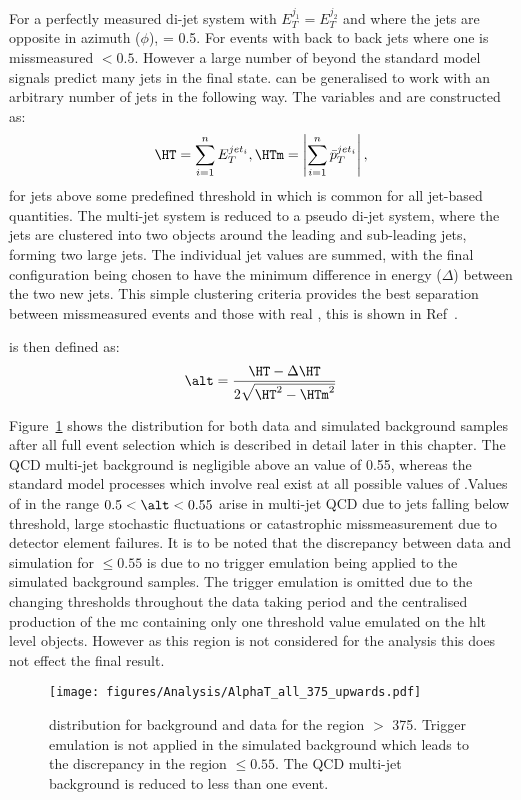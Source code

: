 For a perfectly measured di-jet system with $E_{T}^{j_{1}} = E_{T}^{j_{2}}$ and 
where the jets are opposite in azimuth ($\phi$), \alt = 0.5. For events with back to back jets where one is missmeasured \alt $ < 0.5$.
However a large number of beyond the standard model signals predict many jets in the final state. \alt can be generalised to work with an arbitrary number of jets in the following way. The variables \HT and \HTm are constructed as:
\begin{equation}
  \HT = \sum_{i = 1}^{n}E_{T}^{jet_{i}}, \\
  \HTm = \left|\sum_{i = 1}^{n}\bar{p}_{T}^{jet_{i}}\right|,
\end{equation}
for jets above some predefined threshold in \ET which is common for all jet-based quantities. The multi-jet system is reduced to a pseudo di-jet system, where the jets are clustered into two objects around the leading and sub-leading jets, forming two large jets. The individual jet \ET values are summed, with the final configuration being chosen to have the minimum difference in energy ($\Delta$\HT) between the two new jets. This simple clustering criteria provides the best separation between missmeasured events and those with real \MET, this is shown in Ref~.

\alt is then defined as:
\begin{equation}
  \alt = \frac{\HT - \Delta\HT}{2\sqrt{\HT^{2}-\HTm^{2}}}
\end{equation}


Figure~\ref{fig:figures_Analysis_AlphaT_all_375_upwards} shows the \alt distribution for both data and simulated background samples after all full event selection which is described in detail later in this chapter. The QCD multi-jet background is negligible above an \alt value of 0.55, whereas the standard model processes which involve real \MET exist at all possible values of \alt.Values of \alt in the range $0.5 < \alt < 0.55$ arise in multi-jet QCD due to jets falling below threshold, large stochastic fluctuations or catastrophic missmeasurement due to detector element failures. It is to be noted that the discrepancy between data and simulation for \alt  $\leq 0.55$ is due to no trigger emulation being applied to the simulated background samples. The trigger emulation is omitted due to the changing thresholds throughout the data taking period and the centralised production of the \ac{mc} containing only one threshold value emulated on the \ac{hlt} level objects. However as this region is not considered for the analysis this does not effect the final result.
\begin{figure}[ht|]
  \centering  \texttt{[image: figures/Analysis/AlphaT\_all\_375\_upwards.pdf]}
  \caption{\alt distribution for background and data for the region \HT $>$ 
  \unit{375}{\GeV}. Trigger emulation is not applied in the simulated 
  background which leads to the discrepancy in the region \alt $\leq 0.55$. The 
  QCD multi-jet background is reduced to less than one event.}
  \label{fig:figures_Analysis_AlphaT_all_375_upwards}
\end{figure}

